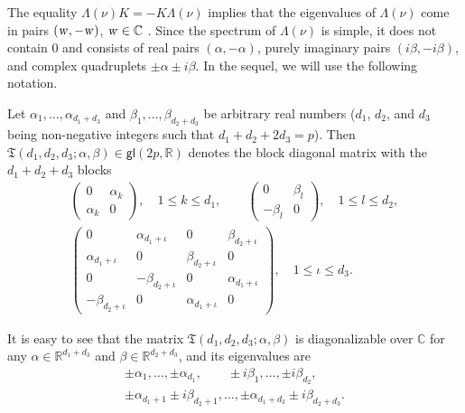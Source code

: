 \documentclass[12pt,reqno]{amsart}
\theoremstyle{definition}
\begin{document}
The equality $\Lambda(\nu)K=-K\Lambda(\nu)$ implies that the eigenvalues of
$\Lambda(\nu)$ come in pairs $({\text{\textsl{w}}},-{\text{\textsl{w}}})$, ${\text{\textsl{w}}}\in{\mathbb C}$
\cite{H96,S86,S92,Sh93}. Since the spectrum of $\Lambda(\nu)$ is simple, it
does not contain $0$ and consists of real pairs $(\alpha,-\alpha)$, purely
imaginary pairs $(i\beta,-i\beta)$, and complex quadruplets
$\pm\alpha\pm i\beta$. In the sequel, we will use the following notation.

\begin{nott}
Let $\alpha_1,\ldots,\alpha_{d_1+d_3}$ and $\beta_1,\ldots,\beta_{d_2+d_3}$ be
arbitrary real numbers ($d_1$, $d_2$, and $d_3$ being non-negative integers
such that $d_1+d_2+2d_3=p$). Then
${\mathfrak T}(d_1,d_2,d_3;\alpha,\beta)\in{\mathsf{gl}}(2p,{\mathbb R})$ denotes the block diagonal
matrix with the $d_1+d_2+d_3$ blocks
\begin{gather*}
\begin{pmatrix} 0 & \alpha_k \\ \alpha_k & 0 \end{pmatrix}, \quad
1{\leqslant} k{\leqslant} d_1, \qquad
\begin{pmatrix} 0 & \beta_l \\ -\beta_l & 0 \end{pmatrix}, \quad
1{\leqslant} l{\leqslant} d_2, \\
\begin{pmatrix}
0 & \alpha_{d_1+\iota} & 0 & \beta_{d_2+\iota} \\
\alpha_{d_1+\iota} & 0 & \beta_{d_2+\iota} & 0 \\
0 & -\beta_{d_2+\iota} & 0 & \alpha_{d_1+\iota} \\
-\beta_{d_2+\iota} & 0 & \alpha_{d_1+\iota} & 0
\end{pmatrix}, \quad 1{\leqslant}\iota{\leqslant} d_3.
\end{gather*}
\end{nott}

It is easy to see that the matrix ${\mathfrak T}(d_1,d_2,d_3;\alpha,\beta)$ is
diagonalizable over ${\mathbb C}$ for any $\alpha\in{\mathbb R}^{d_1+d_3}$ and
$\beta\in{\mathbb R}^{d_2+d_3}$, and its eigenvalues are
\begin{equation}
\begin{gathered}
\pm\alpha_1,\ldots,\pm\alpha_{d_1}, \qquad
\pm i\beta_1,\ldots,\pm i\beta_{d_2}, \\
\pm\alpha_{d_1+1}\pm i\beta_{d_2+1},\ldots,
\pm\alpha_{d_1+d_3}\pm i\beta_{d_2+d_3}.
\end{gathered}
\label{eqspec}
\end{equation}
\end{document}
